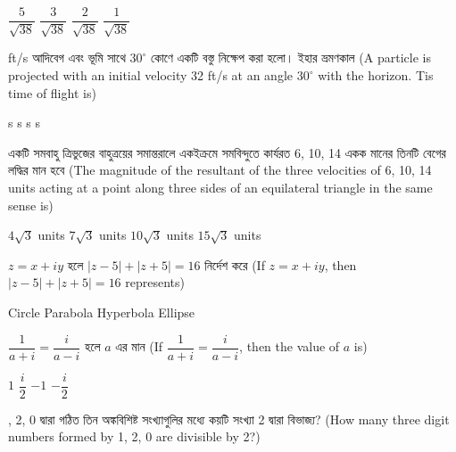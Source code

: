 \documentclass[addpoints]{exam}
\begin{document}
\begin{questions}
\begin{oneparchoices}
\choice $ \dfrac{5}{\sqrt{38}} $
\choice $ \dfrac{3}{\sqrt{38}} $
\choice $ \dfrac{2}{\sqrt{38}} $
\choice  $ \dfrac{1}{\sqrt{38}} $

\end{oneparchoices}


 ft/s  আদিবেগ এবং ভূমি সাথে $ 30^{\circ} $ কোণে একটি বস্তু নিক্ষেপ করা হলো। ইহার ভ্রমণকাল (A particle is projected with an initial velocity 32 ft/s at an angle $ 30^{\circ} $ with the horizon. Tis time of flight is)

\begin{oneparchoices}
 s
 s
 s
 s

\end{oneparchoices}

\question   একটি সমবাহু ত্রিভুজের বাহুত্রয়ের সমান্তরালে একইক্রমে সমবিন্দুতে কার্যরত 6, 10, 14 একক মানের তিনটি বেগের লদ্ধির মান হবে (The magnitude of the resultant of the three velocities of 6, 10, 14 units acting at a point along three sides of an equilateral triangle in the same sense is)

\begin{oneparchoices}
\choice $ 4\sqrt{3} $ units
\choice $ 7\sqrt{3} $ units
\choice $ 10\sqrt{3} $ units
\choice  $ 15\sqrt{3} $ units

\end{oneparchoices}

\question   $ z=x+iy $ হলে $ |z-5| + |z+5| = 16 $ নির্দেশ করে (If $ z=x+iy $, then $ |z-5| + |z+5| = 16 $ represents)

\begin{oneparchoices}
\choice Circle
\choice Parabola
\choice Hyperbola
\choice Ellipse

\end{oneparchoices}

\question  $ \dfrac{1}{a+i} = \dfrac{i}{a-i} $  হলে $ a $ এর মান (If $ \dfrac{1}{a+i} = \dfrac{i}{a-i} $, then the value of $ a $ is)

\begin{oneparchoices}
\choice $ 1 $
\choice $ \dfrac{i}{2} $
\choice $ -1 $
\choice  $ -\dfrac{i}{2} $

\end{oneparchoices}

, 2, 0  দ্বারা গঠিত তিন অঙ্কবিশিষ্ট সংখ্যাগুলির মধ্যে কয়টি সংখ্যা 2 দ্বারা বিভাজ্য? (How many three digit numbers formed by 1, 2, 0 are divisible by 2?)


\end{questions}
\end{document}
